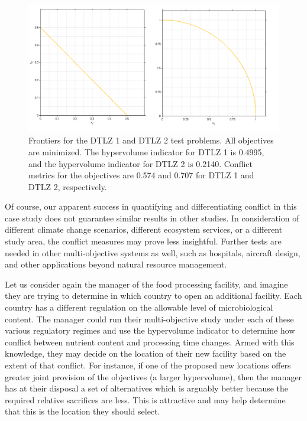 \begin{figure}[ht]
\centering
\includegraphics[width=.9\textwidth]{../images/DTLZFrontiers_1and2}
\caption[Frontiers of the DTLZ 1 and DTLZ 2 test problems]{Frontiers for the DTLZ 1 and DTLZ 2 test problems. All objectives are minimized. The hypervolume indicator for DTLZ 1 is 0.4995, and the hypervolume indicator for DTLZ 2 is 0.2140. Conflict metrics for the objectives are 0.574 and 0.707 for DTLZ 1 and DTLZ 2, respectively.}
\label{fig:dtlzFrontiers}
\end{figure}

Of course, our apparent success in quantifying and differentiating conflict in this case study does not guarantee similar results in other studies. In consideration of different climate change scenarios, different ecosystem services, or a different study area, the conflict measures may prove less insightful. Further tests are needed in other multi-objective systems as well, such as hospitals, aircraft design, and other applications beyond natural resource management.

Let us consider again the manager of the food processing facility, and imagine they are trying to determine in which country to open an additional facility. Each country has a different regulation on the allowable level of microbiological content. The manager could run their multi-objective study under each of these various regulatory regimes and use the hypervolume indicator to determine how conflict between nutrient content and processing time changes. Armed with this knowledge, they may decide on the location of their new facility based on the extent of that conflict. For instance, if one of the proposed new locations offers greater joint provision of the objectives (a larger hypervolume), then the manager has at their disposal a set of alternatives which is arguably better because the required relative sacrifices are less. This is attractive and may help determine that this is the location they should select.

